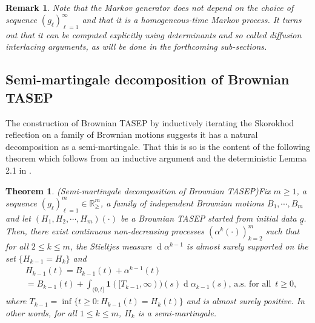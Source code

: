 \documentclass[11pt, reqno]{amsart}
\numberwithin{equation}{section}
\newcounter{dummy} \numberwithin{dummy}{section}
\newtheorem{theorem}[dummy]{Theorem}
\newtheorem*{remark}{Remark}
\newcommand{\R}{\ensuremath{\mathbb{R}}}
\newcommand{\diff}{\ensuremath{\operatorname{d}\!}}
\begin{document}
\begin{remark}\label{rmk: markov generator}
    Note that the Markov generator does not depend on the choice of sequence $(g_\ell)_{\ell=1}^\infty$ and that it is a homogeneous-time Markov process. It turns out that it can be computed explicitly using determinants and so called diffusion interlacing arguments, as will be done in the forthcoming sub-sections.
\end{remark}

\subsection{Semi-martingale decomposition of Brownian TASEP}

The construction of Brownian TASEP by inductively iterating the Skorokhod reflection on a family of Brownian motions suggests it has a natural decomposition as a semi-martingale. That this is so is the content of the following theorem which follows from an inductive argument and the deterministic Lemma 2.1 in \cite{revuz2013continuous}. 

\begin{theorem}(Semi-martingale decomposition of Brownian TASEP)\label{thm: semi-mg decomp blpp}
     Fix $m\ge 1$, a sequence $(g_\ell)_{\ell =1}^m \in\R^m_{\ge}$, a family of independent Brownian motions $B_1, \cdots, B_m$ and let $(H_1, H_2, \cdots, H_m)(\cdot)$ be a Brownian TASEP started from initial data $\underline{g}$. Then, there exist continuous non-decreasing processes $(\alpha^k(\cdot))_{k=2}^m$ such that for all $2\le k \le m$, the Stieltjes measure $\diff \alpha^{k-1}$ is almost surely supported on the set $\{H_{k-1} = H_k\}$ and
     \begin{equation*}
     \begin{array}{cc}
          & H_{k-1}(t) = B_{k-1}(t) + \alpha^{k-1}(t) \\
          & = B_{k-1}(t)+ \displaystyle\int_{(0,t]}\mathbf{1}([T_{k-1},\infty))(s)\diff \alpha_{k-1}(s),\, \text{a.s. for all }\, t\ge 0, 
     \end{array}
     \end{equation*}
     where $T_{k-1} = \inf\{t\ge 0:  H_{k-1}(t) =  H_{k}(t)\}$ and is almost surely positive. In other words, for all $1\le k \le m$, $H_k$ is a semi-martingale.
\end{theorem}
\end{document}
